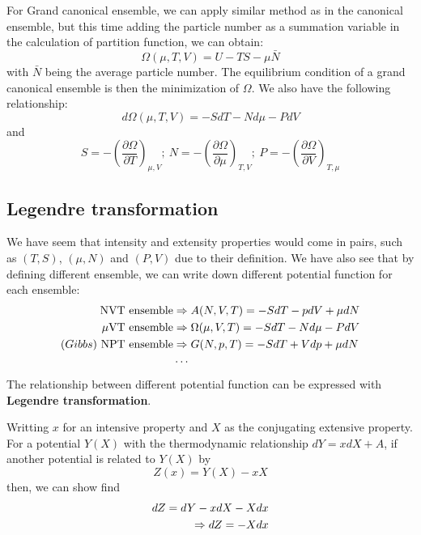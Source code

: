 \documentclass{article}
\begin{document}
For Grand canonical ensemble, we can apply similar method as in the canonical ensemble, but 
this time adding the particle number as a summation variable in the calculation of 
partition function, we can obtain:
\begin{equation}
    \Omega(\mu,T,V) = U - TS - \mu \bar{N}
\end{equation}
with $\bar{N}$ being the average particle number. The equilibrium 
condition of a grand canonical ensemble is then the minimization of $\Omega$. 
We also have the following relationship:
\begin{equation}
    d\Omega(\mu,T,V) = -SdT - Nd\mu - PdV
\end{equation}
and
\begin{equation}
    S = -\left(\frac{\partial \Omega}{\partial T}\right)_{\mu,V};\  
    N = -\left(\frac{\partial \Omega}{\partial \mu}\right)_{T,V};\ 
    P = -\left(\frac{\partial \Omega}{\partial V}\right)_{T,\mu}
\end{equation}

\subsection*{Legendre transformation}
We have seem that intensity and extensity properties would come in pairs, such as $(T,S)$, $(\mu,N)$
and $(P,V)$ due to their definition. We have also see that by defining different ensemble, we can
write down different potential function for each ensemble:
\begin{align}
    \text{NVT ensemble} &\Rightarrow A(N,V,T) = -SdT - pdV + \mu dN\notag \\
    \text{$\mu$VT ensemble} &\Rightarrow \Omega(\mu,V,T) = -SdT - Nd\mu - PdV \notag \\
    (Gibbs)\ \text{NPT ensemble} &\Rightarrow G(N,p,T) = -SdT + Vdp + \mu dN \notag \\
    &\cdots \notag
\end{align}
The relationship between different potential function can be expressed with \textbf{Legendre transformation}.

Writting $x$ for an intensive property and $X$ as the conjugating extensive property. For a potential $Y(X)$
with the thermodynamic relationship $dY = xdX + A$, if another potential is related to $Y(X)$ by 
\begin{equation}
    Z(x) = Y(X) - xX
\end{equation}
then, we can show find 
\begin{align}
    dZ = dY - xdX - Xdx \notag \\
    \Rightarrow dZ = -Xdx \notag
\end{align}
\end{document}
